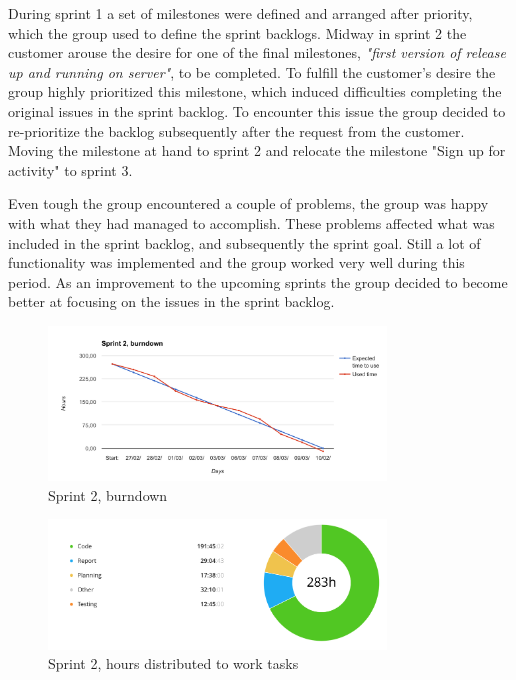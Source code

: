 During sprint 1 a set of milestones were defined and arranged after priority, which the group used to define the sprint backlogs. Midway in sprint 2 the customer arouse the desire for one of the final milestones, \textit{"first version of release up and running on server"}, to be completed. To fulfill the customer's desire the group highly prioritized this milestone, which induced difficulties completing the original issues in the sprint backlog. To encounter this issue the group decided to re-prioritize the backlog subsequently after the request from the customer. Moving the milestone at hand to sprint 2 and relocate the milestone "Sign up for activity" to sprint 3. 

Even tough the group encountered a couple of problems, the group was happy with what they had managed to accomplish. These problems affected what was included in the sprint backlog, and subsequently the sprint goal. Still a lot of functionality was implemented and the group worked very well during this period. As an improvement to the upcoming sprints the group decided to become better at focusing on the issues in the sprint backlog.

\begin{figure}[ht]
\centering
    \includegraphics[width=0.8\textwidth]{fig/sprint2}
\caption{Sprint 2, burndown}
\end{figure}

\begin{figure}[ht]
\centering
    \includegraphics[width=0.8\textwidth]{fig/sprint2-diagram}
\caption{Sprint 2, hours distributed to work tasks}
\end{figure}

